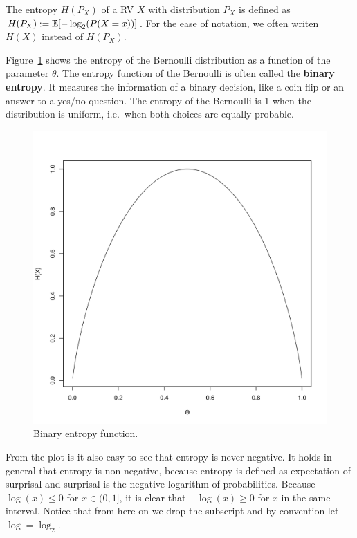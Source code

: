 \begin{Definition}[Entropy]
The entropy $H(P_X)$ of a RV $ X $ with distribution $P_X$ is defined as $H(P_X) := \mathbb{E}[-\log_{2}(P(X=x))]$. For the ease of notation, we often writen $H(X)$ instead of $H(P_X)$.
\end{Definition}

Figure~\ref{fig:binaryEntropy} shows the entropy of the Bernoulli distribution as a function of the
parameter $ \theta $. The entropy function of the Bernoulli is often called the \textbf{binary entropy}.
It measures the information of a binary decision, like a coin flip or an answer to a yes/no-question.
The entropy of the Bernoulli is 1 when the distribution is uniform, i.e.\ when both choices are equally 
probable. 

\begin{figure}
\center
\includegraphics[scale=0.5]{binaryEntropy.png}
\caption{Binary entropy function.}
\label{fig:binaryEntropy}
\end{figure}

From the plot is it also easy to see that entropy is never negative. It holds in general that entropy is non-negative,
because entropy is defined as expectation of surprisal and surprisal is the negative logarithm of probabilities. 
Because $ \log(x) \leq 0 $ for $ x \in (0,1] $, it is clear that $ -\log(x) \geq 0 $ for $ x $ in the same
interval. Notice that from here on we drop the subscript and by convention let $ \log = \log_{2} $.

